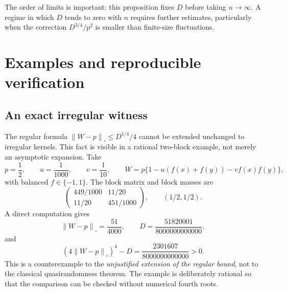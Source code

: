 \documentclass[11pt]{article}
\theoremstyle{definition}
\newcommand{\1}{\mathbf 1}
\newcommand{\Cut}[1]{\left\|#1\right\|_{\square}}
\begin{document}
The order of limits is important: this proposition fixes $D$ before taking $n\to\infty$. A regime in which $D$ tends to zero with $n$ requires further estimates, particularly when the correction $D^{3/4}/p^2$ is smaller than finite-size fluctuations.

\section{Examples and reproducible verification}\label{sec:verification}
\subsection{An exact irregular witness}
The regular formula $\Cut{W-p}\le D^{1/4}/4$ cannot be extended unchanged to irregular kernels. This fact is visible in a rational two-block example, not merely an asymptotic expansion. Take
\[
 p=\frac12,\qquad u=\frac1{1000},\qquad v=\frac1{10},
 \qquad W=p\{1-u(f(x)+f(y))-vf(x)f(y)\},
\]
with balanced $f\in\{-1,1\}$. The block matrix and block masses are
\[
 \begin{pmatrix}449/1000&11/20\\11/20&451/1000\end{pmatrix},
 \qquad(1/2,1/2).
\]
A direct computation gives
\[
 \Cut{W-p}=\frac{51}{4000},\qquad
 D=\frac{51820001}{8000000000000},
\]
and
\begin{equation}\label{eq:rationalwitness}
 (4\Cut{W-p})^4-D=\frac{2301607}{8000000000000}>0.
\end{equation}
This is a counterexample to the \emph{unjustified extension of the regular bound}, not to the classical quasirandomness theorem. The example is deliberately rational so that the comparison can be checked without numerical fourth roots.
\end{document}
